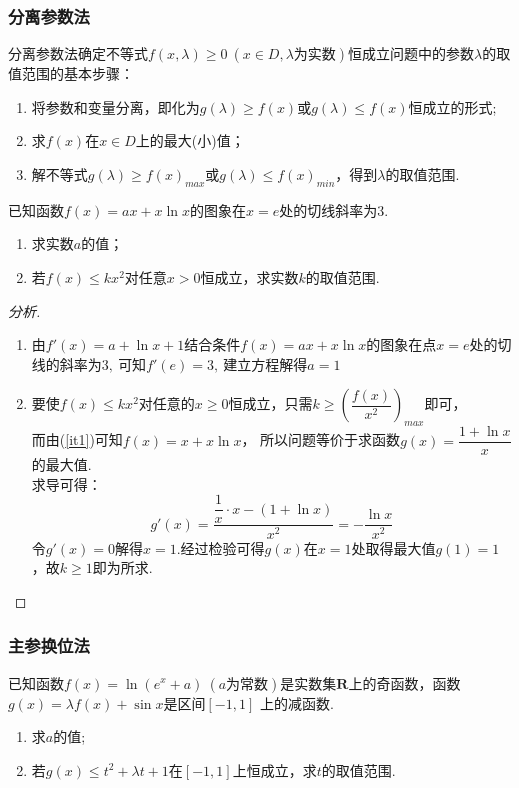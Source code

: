 \subsubsection{分离参数法}
分离参数法确定不等式$ f(x,\lambda)\ge 0 ~(x\in D,\lambda\text{为实数})$恒成立问题中的参数$ \lambda $的取值范围的基本步骤：
\begin{enumerate}[1)]
\item 将参数和变量分离，即化为$ g(\lambda)\ge f(x) \text{或} g(\lambda)\le f(x)$恒成立的形式;
\item 求$ f(x) $在$ x\in D $上的最大(小)值；
\item 解不等式$ g(\lambda)\ge f(x)_{max} \text{或}g(\lambda)\le f(x)_{min}$，得到$ \lambda $的取值范围.
\end{enumerate}
\begin{example}
已知函数$f(x)=ax+x\ln x$的图象在$ x=e $处的切线斜率为$ 3 .$
\end{example}
\begin{enumerate}[(1)]
\item 求实数$a$的值；
\item 若$f(x)\le kx^2$对任意$ x>0 $恒成立，求实数$k$的取值范围.
\end{enumerate}
\begin{proof}[分析]
\begin{enumerate}[(1)]
\item \label{it1}由$f'(x)=a+\ln x+1$结合条件$ f(x)=ax+x\ln x $的图象在点$ x=e $处的切线的斜率为$ 3 ,~$可知$ f'(e)=3,~ $建立方程解得$ a=1 $
\item 要使$ f(x)\le kx^2 $对任意的$ x\ge 0 $恒成立，只需$ k\ge \left(\dfrac{f(x)}{x^2}\right)_{max} $即可，\\而由(\ref{it1})可知$ f(x)=x+x\ln x $，
所以问题等价于求函数$ g(x)=\dfrac{1+\ln x}{x} $的最大值.\\求导可得：
\[ g'(x)=\dfrac{\dfrac{1}{x}\cdot x-(1+\ln x)}{x^2}=-\dfrac{\ln x}{x^2} \]
令$ g'(x)=0 $解得$ x=1 $.经过检验可得$ g(x) $在$ x=1 $处取得最大值$ g(1)=1 $，故$ k\ge 1 $即为所求.
\end{enumerate}
\end{proof}
\subsubsection{主参换位法}
\begin{example}
已知函数$f(x)=\ln (e^x+a)~(a\text{为常数})$是实数集$ \mathbf{R}$上的奇函数，函数$ g(x)=\lambda f(x)+\sin x $是区间$ \left[-1,1\right] $ 上的减函数.\end{example}
\begin{enumerate}[(1)]
\item 求$ a $的值;
\item 若$ g(x)\le t^2+\lambda t+1 $在$ \left[-1,1\right] $上恒成立，求$ t $的取值范围.
\end{enumerate}

